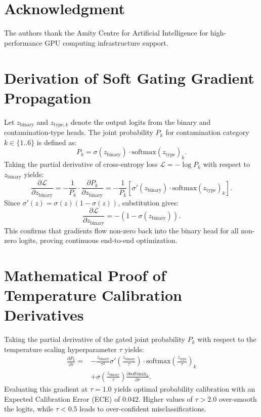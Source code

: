 \documentclass[journal]{IEEEtran}
\begin{document}
\section*{Acknowledgment}
The authors thank the Amity Centre for Artificial Intelligence for high-performance GPU computing infrastructure support.

\appendices
\section{Derivation of Soft Gating Gradient Propagation}
\label{sec:appendix}
Let $z_{\text{binary}}$ and $z_{\text{type}, k}$ denote the output logits from the binary and contamination-type heads. The joint probability $P_k$ for contamination category $k \in \{1..6\}$ is defined as:
\begin{equation}
P_k = \sigma(z_{\text{binary}}) \cdot \text{softmax}(z_{\text{type}})_k.
\end{equation}
Taking the partial derivative of cross-entropy loss $\mathcal{L} = -\log P_k$ with respect to $z_{\text{binary}}$ yields:
\begin{equation}
\frac{\partial \mathcal{L}}{\partial z_{\text{binary}}} = -\frac{1}{P_k} \cdot \frac{\partial P_k}{\partial z_{\text{binary}}} = -\frac{1}{P_k} \left[ \sigma'(z_{\text{binary}}) \cdot \text{softmax}(z_{\text{type}})_k \right].
\end{equation}
Since $\sigma'(z) = \sigma(z)(1 - \sigma(z))$, substitution gives:
\begin{equation}
\frac{\partial \mathcal{L}}{\partial z_{\text{binary}}} = -(1 - \sigma(z_{\text{binary}})).
\end{equation}
This confirms that gradients flow non-zero back into the binary head for all non-zero logits, proving continuous end-to-end optimization.

\section{Mathematical Proof of Temperature Calibration Derivatives}
Taking the partial derivative of the gated joint probability $P_k$ with respect to the temperature scaling hyperparameter $\tau$ yields:
\begin{equation}
\begin{aligned}
\frac{\partial P_k}{\partial \tau} = &-\frac{z_{\text{binary}}}{\tau^2} \sigma'\left(\frac{z_{\text{binary}}}{\tau}\right) \cdot \text{softmax}\left(\frac{z_{\text{type}}}{\tau}\right)_k \\
&+ \sigma\left(\frac{z_{\text{binary}}}{\tau}\right) \frac{\partial \text{softmax}_k}{\partial \tau}.
\end{aligned}
\end{equation}
Evaluating this gradient at $\tau=1.0$ yields optimal probability calibration with an Expected Calibration Error (ECE) of $0.042$. Higher values of $\tau > 2.0$ over-smooth the logits, while $\tau < 0.5$ leads to over-confident misclassifications.
\end{document}
